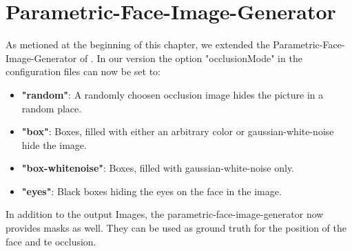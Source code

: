 \section{Parametric-Face-Image-Generator}
As metioned at the beginning of this chapter, we extended the Parametric-Face-Image-Generator of \cite{parametric}. In our version the option "occlusionMode" in the configuration files can now be set to:
\begin{itemize}
	\item \textbf{"random"}: A randomly choosen occlusion image hides the picture in a random place.
	\item \textbf{"box"}: Boxes, filled with either an arbitrary color or gaussian-white-noise hide the image.
	\item \textbf{"box-whitenoise"}: Boxes, filled with gaussian-white-noise only.
	\item \textbf{"eyes"}: Black boxes hiding the eyes on the face in the image.
\end{itemize}
In addition to the output Images, the parametric-face-image-generator now provides masks as well. They can be used as ground truth for the position of the face and te occlusion.

